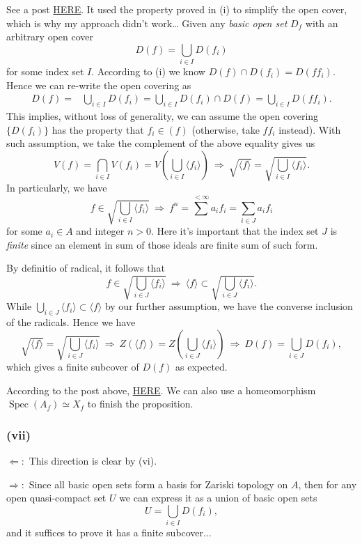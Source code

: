 See a post \href{https://math.stackexchange.com/questions/1175478/basic-open-sets-in-the-zariski-topology-are-also-compact}{HERE}. 
It used the property proved in (i) to simplify the open cover, which is why my approach didn't work\dots 
Given any \textit{basic open set} $D_f$ with an arbitrary open cover 
$$D(f)=\bigcup_{i\in I} D(f_i)$$ for some index set $I$. According to (i) we know $D(f)\cap D(f_i)=D(ff_i)$. Hence we can re-write the open covering as \begin{align*}
    D(f) =& \bigcup_{i\in I} D(f_i)
        = \bigcup_{i\in I} D(f_i)\cap D(f)
        = \bigcup_{i\in I} D(ff_i).
\end{align*}
This implies, without loss of generality, we can assume the open covering $\{D(f_i)\}$ has the property that $f_i\in (f)$ (otherwise, take $ff_i$ instead). With such assumption, we take the complement of the above equality gives us 
$$V(f)=\bigcap_{i\in I} V(f_i)=V(\bigcup_{i\in I}\langle f_i\rangle) ~\Rightarrow~ \sqrt{\langle f\rangle}=\sqrt{\bigcup_{i\in I}\langle f_i\rangle}.$$
In particularly, we have $$f\in \sqrt{\bigcup_{i\in I}\langle f_i\rangle} ~\Rightarrow~ f^n=\sum^{<\infty} a_if_i=\sum_{i\in J}a_if_i$$ for some $a_i\in A$ and integer $n>0$. Here it's important that the index set $J$ is \textit{finite} since an element in sum of those ideals are finite sum of such form. 

By definitio of radical, it follows that 
$$f\in \sqrt{\bigcup_{i\in J}\langle f_i\rangle} ~\Rightarrow~ \langle f\rangle \subset \sqrt{\bigcup_{i\in J}\langle f_i\rangle}.$$ While $\bigcup_{i\in J}\langle f_i\rangle\subset \langle f\rangle$ by our further assumption, we have the converse inclusion of the radicals. 
Hence we have 
$$\sqrt{\langle f\rangle}=\sqrt{\bigcup_{i\in J}\langle f_i\rangle} ~\Rightarrow~ Z(\langle f\rangle)=Z(\bigcup_{i\in J}\langle f_i\rangle) ~\Rightarrow~ D(f)=\bigcup_{i\in J}D(f_i),$$ which gives a finite subcover of $D(f)$ as expected.

According to the post above, \href{https://math.stackexchange.com/questions/1175478/basic-open-sets-in-the-zariski-topology-are-also-compact}{HERE}. We can also use a homeomorphism $\operatorname{Spec}(A_f)\simeq X_f$ to finish the proposition. 
\subsubsection{(vii)}
$\Leftarrow:$ This direction is clear by (vi).
 
$\Rightarrow:$ Since all basic open sets form a basis for Zariski topology on $A$, then for any open quasi-compact set $U$ we can express it as a union of basic open sets 
$$U=\bigcup_{i\in I}D(f_{i}),$$ and it suffices to prove it has a finite subcover... 

